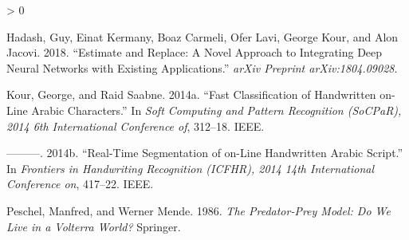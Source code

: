 \documentclass{article}
\newlength{\cslhangindent}
\newenvironment{CSLReferences}[2] %
 {%
  \setlength{\parindent}{0pt}
  \ifodd #1 \everypar{\setlength{\hangindent}{\cslhangindent}}\ignorespaces\fi
  \ifnum #2 > 0
  \setlength{\parskip}{#2\baselineskip}
  \fi
 }%
 {}
\begin{document}
\hypertarget{refs}{}
\begin{CSLReferences}{1}{0}
\leavevmode\hypertarget{ref-hadash2018estimate}{}%
Hadash, Guy, Einat Kermany, Boaz Carmeli, Ofer Lavi, George Kour, and
Alon Jacovi. 2018. {``Estimate and Replace: A Novel Approach to
Integrating Deep Neural Networks with Existing Applications.''}
\emph{arXiv Preprint arXiv:1804.09028}.

\leavevmode\hypertarget{ref-kour2014fast}{}%
Kour, George, and Raid Saabne. 2014a. {``Fast Classification of
Handwritten on-Line Arabic Characters.''} In \emph{Soft Computing and
Pattern Recognition (SoCPaR), 2014 6th International Conference of},
312--18. IEEE.

\leavevmode\hypertarget{ref-kour2014real}{}%
---------. 2014b. {``Real-Time Segmentation of on-Line Handwritten
Arabic Script.''} In \emph{Frontiers in Handwriting Recognition (ICFHR),
2014 14th International Conference on}, 417--22. IEEE.

\leavevmode\hypertarget{ref-peschel1986predator}{}%
Peschel, Manfred, and Werner Mende. 1986. \emph{The Predator-Prey Model:
Do We Live in a Volterra World?} Springer.

\end{CSLReferences}



\end{document}
